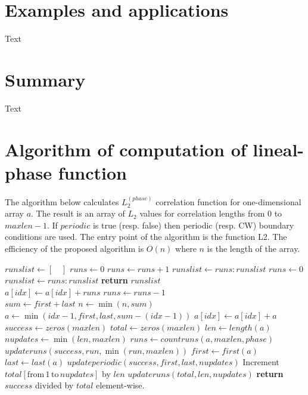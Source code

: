 \documentclass[reprint,amsmath,amssymb,aps,pre]{revtex4-1}
\begin{document}
\section{Examples and applications}
\label{exasec}
Text

\section{Summary}
\label{sumsec}
Text

\appendix
\section{Algorithm of computation of lineal-phase function}
\label{linpathalg}
The algorithm below calculates $L_2^{(phase)}$ correlation function for
one-dimensional array $a$. The result is an array of $L_2$ values for
correlation lengths from $0$ to $maxlen-1$. If $periodic$ is true (resp. false)
then periodic (resp. CW) boundary conditions are used. The entry point of the
algorithm is the function L2. The efficiency of the proposed algorithm is $O(n)$
where $n$ is the length of the array.

\begin{algorithmic}[1]
    \State $runslist \gets [\quad]$
    \State $runs \gets 0$
        \State $runs \gets runs + 1$
        \State $runslist \gets runs:runslist$
        \State $runs \gets 0$
      \EndIf
    \EndFor
      \State $runslist \gets runs:runslist$
    \EndIf
    \State \textbf{return} $runslist$
  \EndProcedure
  \\
      \State $a[idx] \gets a[idx] + runs$
      \State $runs \gets runs - 1$
    \EndFor
  \EndProcedure
  \\
    \State $sum \gets first + last$
    \State $n \gets \min(n, sum)$
      \State $a \gets \min(idx - 1, first, last, sum - (idx - 1))$
      \State $a[idx] \gets a[idx] + a$
    \EndFor
  \EndProcedure
  \\
    \State $success \gets zeros(maxlen)$
    \State $total \gets zeros(maxlen)$
    \State $len \gets length(a)$
    \State $nupdates \gets \min(len, maxlen)$
    \State $runs \gets countruns(a, maxlen, phase)$
      \State $updateruns(success, run, \min(run, maxlen))$
    \EndFor
      \State $first \gets first(a)$
      \State $last \gets last(a)$
        \State $updateperiodic(success, first, last, nupdates)$
      \EndIf
      \State Increment $total[\text{from} \, 1 \, \text{to} \, nupdates]$ by
      $len$
    \Else
      \State $updateruns(total, len, nupdates)$
    \EndIf
    \State \textbf{return} $success$ divided by $total$ element-wise.  
  \EndProcedure
\end{algorithmic}

\onecolumngrid


\twocolumngrid
\end{document}
